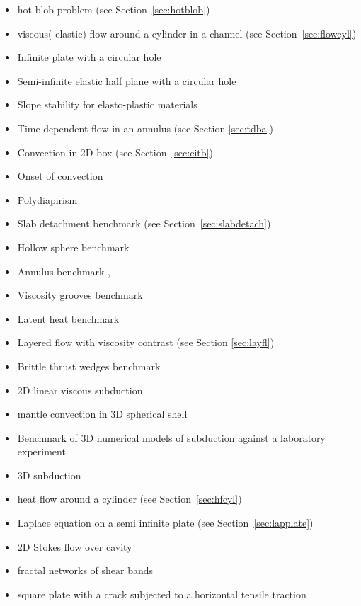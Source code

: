 \begin{itemize}
\item hot blob problem \cite{bugs09,fumt11} (see Section~\ref{sec:hotblob})
\item viscous(-elastic) flow around a cylinder in a channel (see Section~\ref{sec:flowcyl})
\item Infinite plate with a circular hole \cite{rama16}
\item Semi-infinite elastic half plane with a circular hole \cite{verr98}
\item Slope stability for elasto-plastic materials \cite{rama16}
\item Time-dependent flow in an annulus \cite{galb19} (see Section \ref{sec:tdba})
\item Convection in 2D-box \cite{galb19} (see Section~\ref{sec:citb})
\item Onset of convection \cite{aspectmanual}
\item Polydiapirism \cite{wesc92,aspectmanual}
\item Slab detachment benchmark (see Section~\ref{sec:slabdetach}) 
\item Hollow sphere benchmark \cite{thie17}
\item Annulus benchmark \cite{aspectmanual}, \cite{ples11}
\item Viscosity grooves benchmark \cite{aspectmanual}
\item Latent heat benchmark \cite{aspectmanual}
\item Layered flow with viscosity contrast \cite{aspectmanual} (see Section \ref{sec:layfl}) 
\item Brittle thrust wedges benchmark \cite{busa16,aspectmanual}
\item 2D linear viscous subduction \cite{scbe08,gltf18}
\item mantle convection in 3D spherical shell \cite{rasz96,zhzm00,yoka04,sthh06,chcc07,zhmt08,kaks08,wrfy10,dadb13,arfw14,liki19}
\item Benchmark of 3D numerical models of subduction against a laboratory experiment \cite{memm18}
\item 3D subduction \cite{ozrs08}
\item heat flow around a cylinder (see Section~\ref{sec:hfcyl})
\item Laplace equation on a semi infinite plate (see Section~\ref{sec:lapplate})
\item 2D Stokes flow over cavity \cite{poma14}
\item fractal networks of  shear bands \cite{pohe94}
\item square plate with a crack subjected to a horizontal tensile traction \cite{litu02}

\end{itemize}
